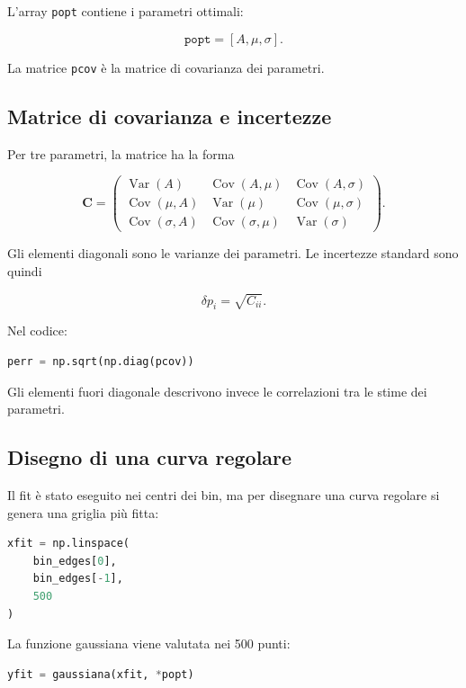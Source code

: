 L'array \texttt{popt} contiene i parametri ottimali:

\[
\texttt{popt}=[A,\mu,\sigma].
\]

La matrice \texttt{pcov} è la matrice di covarianza dei parametri.

\subsection{Matrice di covarianza e incertezze}

Per tre parametri, la matrice ha la forma

\[
\mathbf{C}=
\begin{pmatrix}
\operatorname{Var}(A) & \operatorname{Cov}(A,\mu) &
\operatorname{Cov}(A,\sigma)\\
\operatorname{Cov}(\mu,A) & \operatorname{Var}(\mu) &
\operatorname{Cov}(\mu,\sigma)\\
\operatorname{Cov}(\sigma,A) & \operatorname{Cov}(\sigma,\mu) &
\operatorname{Var}(\sigma)
\end{pmatrix}.
\]

Gli elementi diagonali sono le varianze dei parametri. Le incertezze
standard sono quindi

\[
\delta p_i=\sqrt{C_{ii}}.
\]

Nel codice:

\begin{lstlisting}[language=Python]
perr = np.sqrt(np.diag(pcov))
\end{lstlisting}

Gli elementi fuori diagonale descrivono invece le correlazioni tra le
stime dei parametri.

\subsection{Disegno di una curva regolare}

Il fit è stato eseguito nei centri dei bin, ma per disegnare una curva
regolare si genera una griglia più fitta:

\begin{lstlisting}[language=Python]
xfit = np.linspace(
    bin_edges[0],
    bin_edges[-1],
    500
)
\end{lstlisting}

La funzione gaussiana viene valutata nei 500 punti:

\begin{lstlisting}[language=Python]
yfit = gaussiana(xfit, *popt)
\end{lstlisting}

